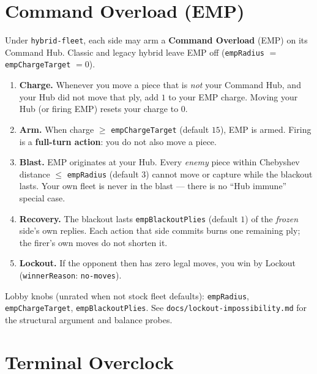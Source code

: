 \documentclass[11pt,a4paper]{article}
\begin{document}
\section{Command Overload (EMP)}
\label{sec:emp}

Under \texttt{hybrid-fleet}, each side may arm a \textbf{Command Overload}
(EMP) on its Command Hub. Classic and legacy hybrid leave EMP off
(\texttt{empRadius} $=$ \texttt{empChargeTarget} $= 0$).

\begin{enumerate}[leftmargin=*]
  \item \textbf{Charge.}
        Whenever you move a piece that is \emph{not} your Command Hub,
        and your Hub did not move that ply, add $1$ to your EMP charge.
        Moving your Hub (or firing EMP) resets your charge to $0$.
  \item \textbf{Arm.}
        When charge $\ge$ \texttt{empChargeTarget} (default $15$), EMP is
        armed. Firing is a \textbf{full-turn action}: you do not also move
        a piece.
  \item \textbf{Blast.}
        EMP originates at your Hub. Every \emph{enemy} piece within
        Chebyshev distance $\le$ \texttt{empRadius} (default $3$) cannot
        move or capture while the blackout lasts. Your own fleet is never
        in the blast --- there is no ``Hub immune'' special case.
  \item \textbf{Recovery.}
        The blackout lasts \texttt{empBlackoutPlies} (default $1$) of the
        \emph{frozen} side's own replies. Each action that side commits
        burns one remaining ply; the firer's own moves do not shorten it.
  \item \textbf{Lockout.}
        If the opponent then has zero legal moves, you win by Lockout
        (\texttt{winnerReason}: \texttt{no-moves}).
\end{enumerate}

Lobby knobs (unrated when not stock fleet defaults):
\texttt{empRadius}, \texttt{empChargeTarget}, \texttt{empBlackoutPlies}.
See \texttt{docs/lockout-impossibility.md} for the structural argument and
balance probes.

\section{Terminal Overclock}
\label{sec:terminal-overclock}
\end{document}
